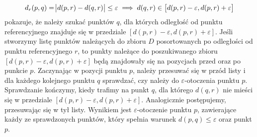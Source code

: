 \begin{equation}\label{eq:ti-search-range}
	d_r(p,q) = \abs{d(p,r)-d(q,r)} \le \varepsilon \implies d(q,r) \in \left[d(p,r)-\varepsilon,d(p,r)+\varepsilon\right]
\end{equation}
 pokazuje, że należy szukać punktów $ q $, dla których odległość od punktu referencyjnego znajduje się w przedziale $ \left[d(p,r)-\varepsilon,d(p,r)+\varepsilon\right]$. Jeśli stworzymy listę punktów należących do zbioru $ D $ posortowanych po odległości od punktu referencyjnego $ r $, to punkty należące do poszukiwanego zbioru $ \left[d(p,r)-\varepsilon,d(p,r)+\varepsilon\right] $ będą znajdowały się na pozycjach przed oraz po punkcie $ p $. Zaczynając w pozycji punktu $ p $, należy przesuwać się w przód listy i dla każdego kolejnego punktu $ q $ sprawdzać, czy należy do $ \varepsilon $-otoczenia punktu $ p $. Sprawdzanie kończymy, kiedy trafimy na punkt $ q $, dla którego $ d(q,r) $ nie mieści się w przedziale $ \left[d(p,r)-\varepsilon,d(p,r)+\varepsilon\right] $. Analogicznie postępujemy, przesuwając się w tył listy. Wynikiem jest $ \varepsilon $-otoczenie punktu $ p $, zawierające każdy ze sprawdzonych punktów, który spełnia warunek $ d(p,q) \le \varepsilon $ oraz punkt $ p $.
